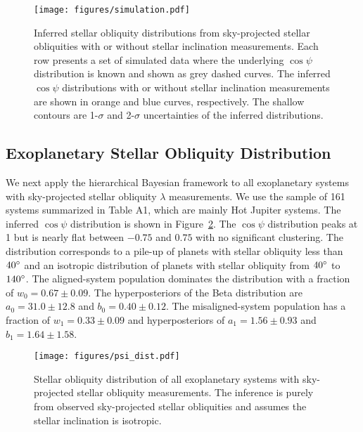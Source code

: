\documentclass[twocolumn,times]{aastex631}
\begin{document}
\begin{figure}[ht!]
    \texttt{[image: figures/simulation.pdf]}
    \caption{Inferred stellar obliquity distributions from sky-projected stellar obliquities with or without stellar inclination measurements. Each row presents a set of simulated data where the underlying $\cos{\psi}$ distribution is known and shown as grey dashed curves. The inferred $\cos{\psi}$ distributions with or without stellar inclination measurements are shown in orange and blue curves, respectively. The shallow contours are 1-$\sigma$ and 2-$\sigma$ uncertainties of the inferred distributions.}
    \label{fig:simulation}
\end{figure}

\subsection{Exoplanetary Stellar Obliquity Distribution}

We next apply the hierarchical Bayesian framework to all exoplanetary systems with sky-projected stellar obliquity $\lambda$ measurements. We use the sample of 161 systems summarized in \cite{Albrecht22} Table A1, which are mainly Hot Jupiter systems. The inferred $\cos{\psi}$ distribution is shown in Figure~\ref{fig:psi_dist}. The $\cos{\psi}$ distribution peaks at 1 but is nearly flat between $-0.75$ and $0.75$ with no significant clustering. The distribution corresponds to a pile-up of planets with stellar obliquity less than $40\mbox{$^\circ$}$ and an isotropic distribution of planets with stellar obliquity from $40\mbox{$^\circ$}$ to $140\mbox{$^\circ$}$. 
The aligned-system population dominates the distribution with a fraction of $w_0 = 0.67 \pm 0.09$. The hyperposteriors of the Beta distribution are $a_0 = 31.0\pm12.8$ and $b_0 = 0.40\pm0.12$.
The misaligned-system population has a fraction of $w_1 = 0.33 \pm 0.09$ and hyperposteriors of $a_1 = 1.56\pm0.93$ and $b_1 = 1.64\pm1.58$.

\begin{figure}[ht!]
    \begin{centering}
        \texttt{[image: figures/psi\_dist.pdf]}
        \caption{Stellar obliquity distribution of all exoplanetary systems with sky-projected stellar obliquity measurements. The inference is purely from observed sky-projected stellar obliquities and assumes the stellar inclination is isotropic.}
        \label{fig:psi_dist}
    \end{centering}
\end{figure}
\end{document}
